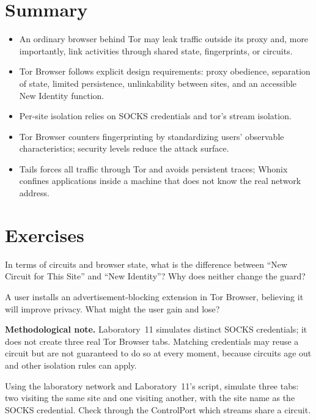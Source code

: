 \section*{Summary}
\begin{itemize}
  \item An ordinary browser behind Tor may leak traffic outside its proxy and, more importantly, link activities through shared state, fingerprints, or circuits.
  \item Tor Browser follows explicit design requirements: proxy obedience, separation of state, limited persistence, unlinkability between sites, and an accessible New Identity function.
  \item Per-site isolation relies on SOCKS credentials and tor's stream isolation.
  \item Tor Browser counters fingerprinting by standardizing users' observable characteristics; security levels reduce the attack surface.
  \item Tails forces all traffic through Tor and avoids persistent traces; Whonix confines applications inside a machine that does not know the real network address.
\end{itemize}

\section*{Exercises}

\begin{esercizio}[1]\label{es:23-identita}
In terms of circuits and browser state, what is the difference between \enquote{New Circuit for This Site} and \enquote{New Identity}? Why does neither change the guard?
\end{esercizio}

\begin{esercizio}[1]\label{es:23-estensioni}
A user installs an advertisement-blocking extension in Tor Browser, believing it will improve privacy. What might the user gain and lose?
\end{esercizio}

\textbf{Methodological note.} Laboratory~11 simulates distinct SOCKS credentials; it does not create three real Tor Browser tabs. Matching credentials may reuse a circuit but are not guaranteed to do so at every moment, because circuits age out and other isolation rules can apply.

\begin{esercizio}[2]\label{es:23-isolamento}
Using the laboratory network and Laboratory~11's script, simulate three tabs: two visiting the same site and one visiting another, with the site name as the SOCKS credential. Check through the ControlPort which streams share a circuit.
\end{esercizio}

